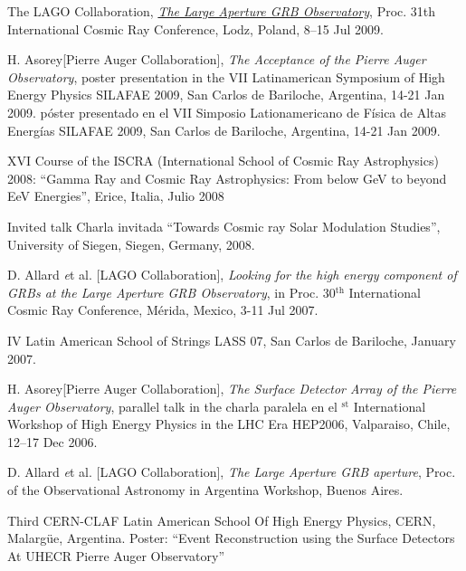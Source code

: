 \begin{etaremune}
\item {}The LAGO Collaboration,
\href{http://arxiv.org/abs/0906.0816}{\emph{The Large Aperture GRB
Observatory}}, \en Proc. 31th International Cosmic Ray Conference, Lodz,
Poland, 8--15 Jul 2009.

\item {}H. Asorey[Pierre Auger Collaboration], {\emph{The Acceptance of the
Pierre Auger Observatory}}, 
\ifeng
poster presentation in the VII Latinamerican Symposium of High Energy Physics SILAFAE 2009, San Carlos de Bariloche, Argentina, 14-21 Jan 2009.
\else
póster presentado en el VII Simposio Lationamericano de Física de Altas Energías SILAFAE 2009, San Carlos de Bariloche, Argentina, 14-21 Jan 2009.
\fi

\item {}XVI Course of the ISCRA (International School of Cosmic Ray Astrophysics) 2008: ``Gamma Ray and Cosmic Ray Astrophysics: From below GeV to beyond EeV Energies'', Erice, Italia, Julio 2008

\item {}\ifeng Invited talk \else Charla invitada \fi ``Towards Cosmic ray Solar Modulation Studies'', University of Siegen, Siegen, Germany, 2008.

\item {}D. Allard {\emph et al.} [LAGO Collaboration], {\emph{Looking for the high energy component of GRBs at the Large Aperture GRB Observatory}}, in Proc. 30$^{\mathrm{th}}$ International Cosmic Ray Conference,  Mérida, Mexico, 3-11 Jul 2007.

\item {}IV Latin American School of Strings LASS 07, San Carlos de Bariloche, January 2007.

\item {}H. Asorey[Pierre Auger Collaboration], {\emph{The Surface Detector Array of the Pierre Auger Observatory}}, 
\ifeng
parallel talk in the 
\else
charla paralela en el 
$^{\mathrm{st}}$ International Workshop of High Energy Physics in the LHC Era HEP2006, Valparaiso, Chile, 12--17 Dec 2006.

\item {}D. Allard {\emph et al.} [LAGO Collaboration], {\emph{The Large Aperture GRB aperture}}, \en Proc. of the Observational Astronomy in Argentina Workshop, Buenos Aires.

\item {}Third CERN-CLAF Latin American School Of High Energy Physics, CERN, Malargüe, Argentina. Poster: ``Event Reconstruction using the Surface Detectors At UHECR Pierre Auger Observatory''


\end{etaremune}
